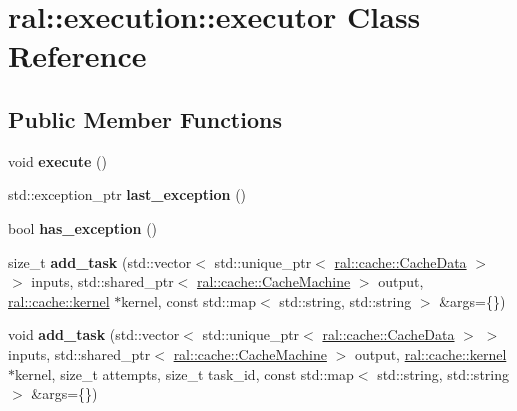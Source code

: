 \hypertarget{classral_1_1execution_1_1executor}{}\section{ral\+:\+:execution\+:\+:executor Class Reference}
\label{classral_1_1execution_1_1executor}
\subsection*{Public Member Functions}
\begin{DoxyCompactItemize}
\item 
\mbox{\label{classral_1_1execution_1_1executor_a6e6ac943f9eaf839cc0e41eb23439072}} 
void {\bfseries execute} ()
\item 
\mbox{\label{classral_1_1execution_1_1executor_a09da28a656f7612cc886a846bb6d64af}} 
std\+::exception\+\_\+ptr {\bfseries last\+\_\+exception} ()
\item 
\mbox{\label{classral_1_1execution_1_1executor_aaed7cfdaada8399996aed20602d8daa8}} 
bool {\bfseries has\+\_\+exception} ()
\item 
\mbox{\label{classral_1_1execution_1_1executor_aa11c54e453247b7f83d6670eea50bfcd}} 
size\+\_\+t {\bfseries add\+\_\+task} (std\+::vector$<$ std\+::unique\+\_\+ptr$<$ \hyperlink{classral_1_1cache_1_1CacheData}{ral\+::cache\+::\+Cache\+Data} $>$ $>$ inputs, std\+::shared\+\_\+ptr$<$ \hyperlink{classral_1_1cache_1_1CacheMachine}{ral\+::cache\+::\+Cache\+Machine} $>$ output, \hyperlink{classral_1_1cache_1_1kernel}{ral\+::cache\+::kernel} $\ast$kernel, const std\+::map$<$ std\+::string, std\+::string $>$ \&args=\{\})
\item 
\mbox{\label{classral_1_1execution_1_1executor_a77fdef46e83963032e67583e4d5392ca}} 
void {\bfseries add\+\_\+task} (std\+::vector$<$ std\+::unique\+\_\+ptr$<$ \hyperlink{classral_1_1cache_1_1CacheData}{ral\+::cache\+::\+Cache\+Data} $>$ $>$ inputs, std\+::shared\+\_\+ptr$<$ \hyperlink{classral_1_1cache_1_1CacheMachine}{ral\+::cache\+::\+Cache\+Machine} $>$ output, \hyperlink{classral_1_1cache_1_1kernel}{ral\+::cache\+::kernel} $\ast$kernel, size\+\_\+t attempts, size\+\_\+t task\+\_\+id, const std\+::map$<$ std\+::string, std\+::string $>$ \&args=\{\})

\end{DoxyCompactItemize}
